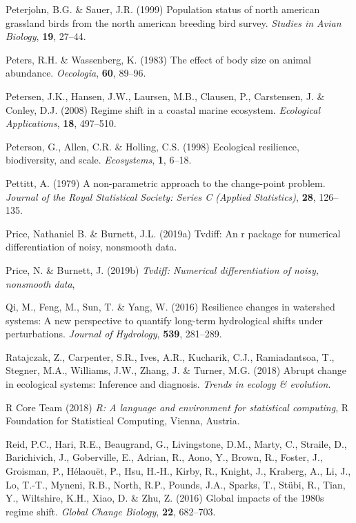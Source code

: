 \documentclass[12pt,twoside,openany]{reedthesis}
\begin{document}
\leavevmode\hypertarget{ref-peterjohn1999population}{}%
Peterjohn, B.G. \& Sauer, J.R. (1999) Population status of north american grassland birds from the north american breeding bird survey. \emph{Studies in Avian Biology}, \textbf{19}, 27--44.

\leavevmode\hypertarget{ref-peters1983effect}{}%
Peters, R.H. \& Wassenberg, K. (1983) The effect of body size on animal abundance. \emph{Oecologia}, \textbf{60}, 89--96.

\leavevmode\hypertarget{ref-petersen2008regime}{}%
Petersen, J.K., Hansen, J.W., Laursen, M.B., Clausen, P., Carstensen, J. \& Conley, D.J. (2008) Regime shift in a coastal marine ecosystem. \emph{Ecological Applications}, \textbf{18}, 497--510.

\leavevmode\hypertarget{ref-peterson1998ecological}{}%
Peterson, G., Allen, C.R. \& Holling, C.S. (1998) Ecological resilience, biodiversity, and scale. \emph{Ecosystems}, \textbf{1}, 6--18.

\leavevmode\hypertarget{ref-pettitt1979non}{}%
Pettitt, A. (1979) A non-parametric approach to the change-point problem. \emph{Journal of the Royal Statistical Society: Series C (Applied Statistics)}, \textbf{28}, 126--135.

\leavevmode\hypertarget{ref-price2019tvdiff}{}%
Price, Nathaniel B. \& Burnett, J.L. (2019a) Tvdiff: An r package for numerical differentiation of noisy, nonsmooth data.

\leavevmode\hypertarget{ref-tvdiff}{}%
Price, N. \& Burnett, J. (2019b) \emph{Tvdiff: Numerical differentiation of noisy, nonsmooth data},

\leavevmode\hypertarget{ref-qi2016resilience}{}%
Qi, M., Feng, M., Sun, T. \& Yang, W. (2016) Resilience changes in watershed systems: A new perspective to quantify long-term hydrological shifts under perturbations. \emph{Journal of Hydrology}, \textbf{539}, 281--289.

\leavevmode\hypertarget{ref-ratajczak2018abrupt}{}%
Ratajczak, Z., Carpenter, S.R., Ives, A.R., Kucharik, C.J., Ramiadantsoa, T., Stegner, M.A., Williams, J.W., Zhang, J. \& Turner, M.G. (2018) Abrupt change in ecological systems: Inference and diagnosis. \emph{Trends in ecology \& evolution}.

\leavevmode\hypertarget{ref-base}{}%
R Core Team (2018) \emph{R: A language and environment for statistical computing}, R Foundation for Statistical Computing, Vienna, Austria.

\leavevmode\hypertarget{ref-reid_global_2016}{}%
Reid, P.C., Hari, R.E., Beaugrand, G., Livingstone, D.M., Marty, C., Straile, D., Barichivich, J., Goberville, E., Adrian, R., Aono, Y., Brown, R., Foster, J., Groisman, P., Hélaouët, P., Hsu, H.-H., Kirby, R., Knight, J., Kraberg, A., Li, J., Lo, T.-T., Myneni, R.B., North, R.P., Pounds, J.A., Sparks, T., Stübi, R., Tian, Y., Wiltshire, K.H., Xiao, D. \& Zhu, Z. (2016) Global impacts of the 1980s regime shift. \emph{Global Change Biology}, \textbf{22}, 682--703.
\end{document}
